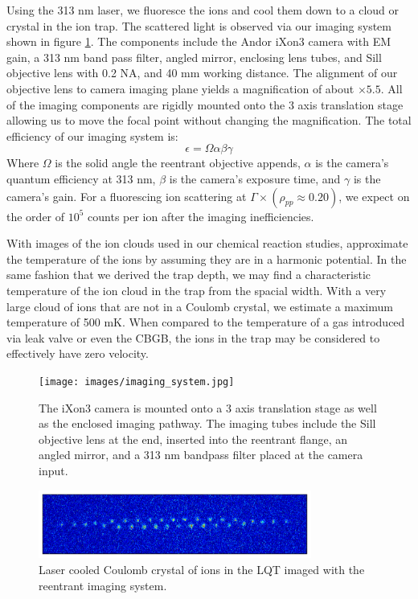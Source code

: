 Using the 313 nm laser, we fluoresce the  ions and cool them down to a cloud or crystal in the ion trap. The scattered light is observed via our imaging system shown in figure \ref{fig: imaging system}. The components include the Andor iXon3 camera with EM gain, a 313 nm band pass filter, angled mirror, enclosing lens tubes, and Sill objective lens with 0.2 NA, and 40 mm working distance. The alignment of our objective lens to camera imaging plane yields a magnification of about $\times5.5$. All of the imaging components are rigidly mounted onto the 3 axis translation stage allowing us to move the focal point without changing the magnification. The total efficiency of our imaging system is:
\begin{equation}
	\epsilon = \Omega \alpha \beta \gamma
	\label{eq: fluorescence efficiency}
\end{equation}
Where $\Omega$ is the solid angle the reentrant objective appends, $\alpha$ is the camera's quantum efficiency at 313 nm, $\beta$ is the camera's exposure time, and $\gamma$ is the camera's gain. For a fluorescing ion scattering at $\Gamma \times (\rho_{pp} \approx 0.20)$, we expect on the order of $10^5$ counts per ion after the imaging inefficiencies.

With images of the ion clouds used in our chemical reaction studies, approximate the temperature of the ions by assuming they are in a harmonic potential. In the same fashion that we derived the trap depth, we may find a characteristic temperature of the ion cloud in the trap from the spacial width. With a very large cloud of ions that are not in a Coulomb crystal, we estimate a maximum temperature of 500 mK. When compared to the temperature of a gas introduced via leak valve or even the CBGB, the ions in the trap may be considered to effectively have zero velocity.

\begin{figure}[H]
	\centering
	\texttt{[image: images/imaging\_system.jpg]}
	\caption{The iXon3 camera is mounted onto a 3 axis translation stage as well as the enclosed imaging pathway. The imaging tubes include the Sill objective lens at the end, inserted into the reentrant flange, an angled mirror, and a 313 nm bandpass filter placed at the camera input.}
	\label{fig: imaging system}
\end{figure}

\begin{figure}[H]
	\centering
	\includegraphics[width=0.8\textwidth]{images/ion_crystal_blue.png}
	\caption{Laser cooled Coulomb crystal of  ions in the LQT imaged with the reentrant imaging system.}
	\label{fig: ion crystal}
\end{figure}